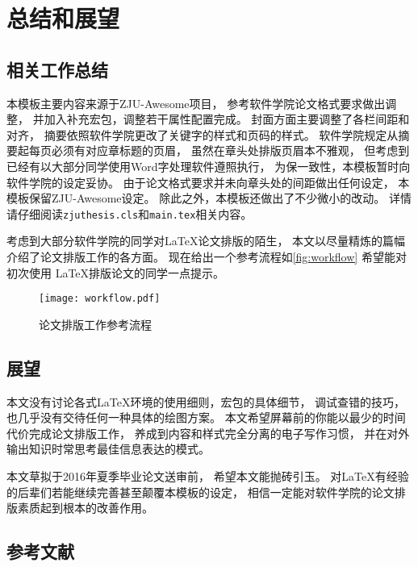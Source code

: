 
\chapter{总结和展望}

\section{相关工作总结}

本模板主要内容来源于ZJU-Awesome项目，
参考软件学院论文格式要求做出调整，
并加入补充宏包，调整若干属性配置完成。
封面方面主要调整了各栏间距和对齐，
摘要依照软件学院更改了关键字的样式和页码的样式。
软件学院规定从摘要起每页必须有对应章标题的页眉，
虽然在章头处排版页眉本不雅观，
但考虑到已经有以大部分同学使用Word字处理软件遵照执行，
为保一致性，本模板暂时向软件学院的设定妥协。
由于论文格式要求并未向章头处的间距做出任何设定，
本模板保留ZJU-Awesome设定。
除此之外，本模板还做出了不少微小的改动。
详情请仔细阅读\texttt{zjuthesis.cls}和\texttt{main.tex}相关内容。

考虑到大部分软件学院的同学对\LaTeX 论文排版的陌生，
本文以尽量精炼的篇幅介绍了论文排版工作的各方面。
现在给出一个参考流程如\autoref{fig:workflow} 希望能对初次使用
\LaTeX 排版论文的同学一点提示。

\begin{figure}[htbp]
    \centering
    \texttt{[image: workflow.pdf]}
    \caption{论文排版工作参考流程}
    \label{fig:workflow}
\end{figure}

\section{展望}

本文没有讨论各式\LaTeX 环境的使用细则，宏包的具体细节，
调试查错的技巧，也几乎没有交待任何一种具体的绘图方案。
本文希望屏幕前的你能以最少的时间代价完成论文排版工作，
养成到内容和样式完全分离的电子写作习惯，
并在对外输出知识时常思考最佳信息表达的模式。

本文草拟于2016年夏季毕业论文送审前，
希望本文能抛砖引玉。
对\LaTeX 有经验的后辈们若能继续完善甚至颠覆本模板的设定，
相信一定能对软件学院的论文排版素质起到根本的改善作用。

\section{参考文献}

